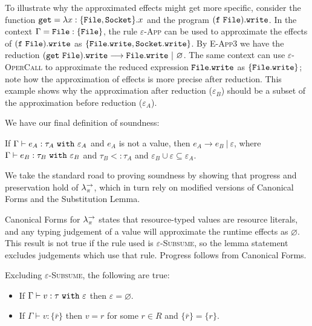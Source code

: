 To illustrate why the approximated effects might get more specific, consider the function $\mathtt{get} = \lambda x: \{ \mathtt{File, Socket} \} .x$ and the program $\mathtt{(f~File).write}$. In the context $\Gamma = \mathtt{File: \{ File \}}$, the rule \textsc{$\varepsilon$-App} can be used to approximate the effects of $\mathtt{(f~File).write}$ as $\{ \mathtt{File.write, Socket.write} \}$. By \textsc{E-App3} we have the reduction $\mathtt{(get~File).write} \longrightarrow \mathtt{File.write}~|~\varnothing$. The same context can use \textsc{$\varepsilon$-OperCall} to approximate the reduced expression $\mathtt{File.write}$ as $\{ \mathtt{File.write} \}$; note how the approximation of effects is more precise after reduction. This example shows why the approximation after reduction ($\varepsilon_B$) should be a subset of the approximation before reduction ($\varepsilon_A$).

We have our final definition of soundness:

\begin{theorem}[Soundness]
If $ \Gamma \vdash  e_A:  \tau_A~\mathtt{with}~ \varepsilon_A$ and $ e_A$ is not a value, then $e_A \longrightarrow e_B~|~\varepsilon$, where $ \Gamma \vdash e_B:  \tau_B~\mathtt{with}~ \varepsilon_B$ and $ \tau_B <:  \tau_A$ and $\varepsilon_B \cup \varepsilon \subseteq \varepsilon_A$.
\end{theorem}

We take the standard road to proving soundness by showing that progress and preservation hold of $\lambda^{\rightarrow}_{\pi}$, which in turn rely on modified versions of Canonical Forms and the Substitution Lemma.

Canonical Forms for $\lambda^{\rightarrow}_{\pi}$ states that resource-typed values are resource literals, and any typing judgement of a value will approximate the runtime effects as $\varnothing$. This result is not true if the rule used is \textsc{$\varepsilon$-Subsume}, so the lemma statement excludes judgements which use that rule. Progress follows from Canonical Forms.

\begin{lemma}
Excluding \textsc{$\varepsilon$-Subsume}, the following are true:
\begin{itemize}
	\setlength\itemsep{-0.7em}
	\item If $ \Gamma \vdash  v:  \tau~\mathtt{with}~ \varepsilon$ then $\varepsilon = \varnothing$.
	\item If $ \Gamma \vdash  v: \{ \bar r \}$ then $ v = r$ for some $r \in R$ and $\{ \bar r \} = \{ r \}$.
\end{itemize}
\end{lemma}

